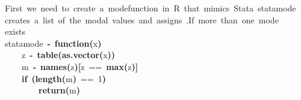\documentclass[12pt]{article}
\makeatletter
\newcommand{\hlnumber}[1]{\textcolor[rgb]{0,0,0}{#1}}%
\newcommand{\hlfunctioncall}[1]{\textcolor[rgb]{0.501960784313725,0,0.329411764705882}{\textbf{#1}}}%
\newcommand{\hlkeyword}[1]{\textcolor[rgb]{0,0,0}{\textbf{#1}}}%
\newcommand{\hlcomment}[1]{\textcolor[rgb]{0.180392156862745,0.6,0.341176470588235}{#1}}%
\newcommand{\hlformalargs}[1]{\textcolor[rgb]{0.690196078431373,0.250980392156863,0.0196078431372549}{#1}}%
\newcommand{\hlassignement}[1]{\textcolor[rgb]{0,0,0}{\textbf{#1}}}%
\newcommand{\hlsymbol}[1]{\textcolor[rgb]{0,0,0}{#1}}%
\newcommand{\hlstd}[1]{\textcolor[rgb]{0,0,0}{#1}}%
\newenvironment{kframe}{%
 \def\FrameCommand##1{\hskip\@totalleftmargin \hskip-\fboxsep
 \colorbox{shadecolor}{##1}\hskip-\fboxsep
     \hskip-\linewidth \hskip-\@totalleftmargin \hskip\columnwidth}%
 \MakeFramed {\advance\hsize-\width
   \@totalleftmargin\z@ \linewidth\hsize
   \@setminipage}}%
 {\par\unskip\endMakeFramed}
\newenvironment{knitrout}{}{} %
\makeatother
\begin{document}
\begin{knitrout}
\color{fgcolor}\begin{kframe}
\begin{flushleft}
\ttfamily\noindent
\hlcomment{\usebox{\hlnormalsizeboxhash}{\ }First{\ }we{\ }need{\ }to{\ }create{\ }a{\ }\usebox{\hlnormalsizeboxsinglequote}mode\usebox{\hlnormalsizeboxsinglequote}{\ }function{\ }in{\ }R{\ }that{\ }mimics{\ }Stata{\ }statamode}\hspace*{\fill}\\
\hlstd{}\hlcomment{\usebox{\hlnormalsizeboxhash}{\ }creates{\ }a{\ }list{\ }of{\ }the{\ }modal{\ }values{\ }and{\ }assigns{\ }\usebox{\hlnormalsizeboxsinglequote}.\usebox{\hlnormalsizeboxsinglequote}{\ }{\ }If{\ }more{\ }than{\ }one{\ }mode}\hspace*{\fill}\\
\hlstd{}\hlcomment{\usebox{\hlnormalsizeboxhash}{\ }exists}\hspace*{\fill}\\
\hlstd{}\hlsymbol{statamode}{\ }\hlassignement{\usebox{\hlnormalsizeboxlessthan}-}{\ }\hlkeyword{function}\hlkeyword{(}\hlformalargs{x}\hlkeyword{)}{\ }\hlkeyword{\usebox{\hlnormalsizeboxopenbrace}}\hspace*{\fill}\\
\hlstd{}{\ }{\ }{\ }{\ }\hlsymbol{z}{\ }\hlassignement{\usebox{\hlnormalsizeboxlessthan}-}{\ }\hlfunctioncall{table}\hlkeyword{(}\hlfunctioncall{as.vector}\hlkeyword{(}\hlsymbol{x}\hlkeyword{)}\hlkeyword{)}\hspace*{\fill}\\
\hlstd{}{\ }{\ }{\ }{\ }\hlsymbol{m}{\ }\hlassignement{\usebox{\hlnormalsizeboxlessthan}-}{\ }\hlfunctioncall{names}\hlkeyword{(}\hlsymbol{z}\hlkeyword{)}\hlkeyword{[}\hlsymbol{z}{\ }=={\ }\hlfunctioncall{max}\hlkeyword{(}\hlsymbol{z}\hlkeyword{)}\hlkeyword{]}\hspace*{\fill}\\
\hlstd{}{\ }{\ }{\ }{\ }\hlkeyword{if}{\ }\hlkeyword{(}\hlfunctioncall{length}\hlkeyword{(}\hlsymbol{m}\hlkeyword{)}{\ }=={\ }\hlnumber{1}\hlkeyword{)}{\ }\hlkeyword{\usebox{\hlnormalsizeboxopenbrace}}\hspace*{\fill}\\
\hlstd{}{\ }{\ }{\ }{\ }{\ }{\ }{\ }{\ }\hlfunctioncall{return}\hlkeyword{(}\hlsymbol{m}\hlkeyword{)}\hspace*{\fill}\\
\hlstd{}{\ }{\ }{\ }{\ }\hlkeyword{\usebox{\hlnormalsizeboxclosebrace}}\hspace*{\fill}\\

\end{flushleft}
\end{kframe}
\end{knitrout}
\end{document}
